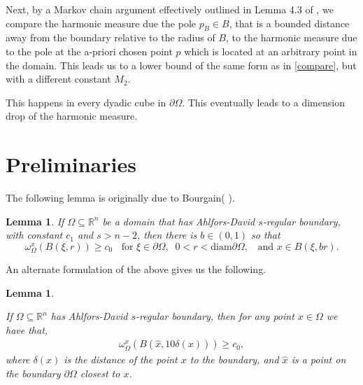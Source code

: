 \documentclass{article}
\newcounter{rmk}
\newcounter{lem}
\theoremstyle{plain}
\theoremstyle{plain}
\newcommand{\R}{\mathbb{R}}
\newtheorem{lemma}[theorem]{Lemma}
\theoremstyle{definition}
\newtheorem{remark}[rmk]{Remark}
\theoremstyle{plain}
\begin{document}
Next, by a Markov chain argument effectively outlined in Lemma 4.3 of \cite{Az20}, we compare the harmonic measure due the pole $p_B\in B$, that is a bounded distance away from the boundary relative to the radius of $B$, to the harmonic measure due to the pole at the a-priori chosen point $p$ which is located at an arbitrary point in the domain. This leads us to a lower bound of the same form as in \cref{compare}, but with a different constant $M_2$.

This happens in every dyadic cube in $\partial\Omega$. This eventually leads to a dimension drop of the harmonic measure. 

\section{Preliminaries}

The following lemma is originally due to Bourgain( \cite[Lemma 1]{Bou87}).

\begin{lemma} 
\label{l:bourgain}
If $\Omega\subseteq \R^{n}$ be a domain that has Ahlfors-David $s$-regular boundary, with constant $c_{1}$ and $s>n-2$, then there is $b\in (0,1)$ so that 
\begin{equation}
\label{e:bou}
\omega_{\Omega}^{x}(B(\xi,r))\geq c_{0} \;\;\mbox{ for }\xi\in \partial\Omega, \;\; 0<r<\text{diam} \partial\Omega,\;\; \mbox{ and }x\in B(\xi,b r).
\end{equation}
\end{lemma}

An alternate formulation of the above gives us the following.
\begin{lemma}\label{r:bourgain}

If $\Omega\subseteq \R^{n}$ has Ahlfors-David $s$-regular boundary, then for any point $x\in \Omega$ we have that, 
\begin{align}
    \omega_{\Omega}^{x}(B(\hat{x},10\delta(x)))\geq c_0,
\end{align}
    where $\delta(x)$ is the distance of the point $x$ to the boundary, and $\hat{x}$ is a point on the boundary $\partial\Omega$ closest to $x$.
\end{lemma}


\end{document}
